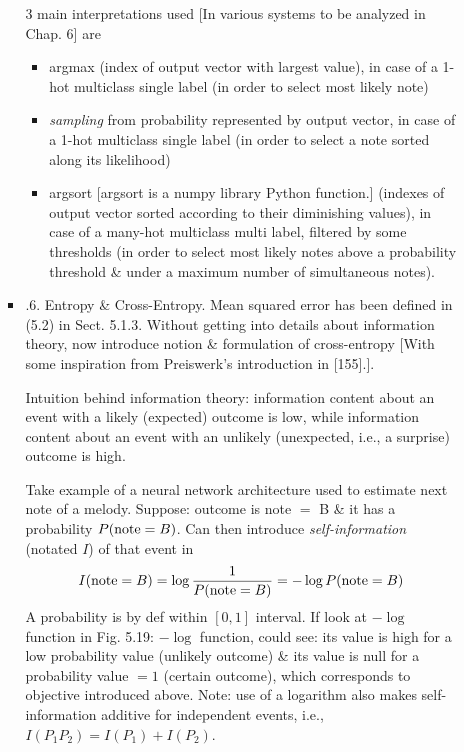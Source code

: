 \documentclass{article}
\begin{document}
\begin{itemize}
\begin{itemize}
\begin{itemize}
\begin{itemize}
			\end{itemize}
			3 main interpretations used [In various systems to be analyzed in Chap. 6] are
			\begin{itemize}
				\item argmax (index of output vector with largest value), in case of a 1-hot multiclass single label (in order to select most likely note)
				\item {\it sampling} from probability represented by output vector, in case of a 1-hot multiclass single label (in order to select a note sorted along its likelihood)
				\item argsort [argsort is a numpy library Python function.] (indexes of output vector sorted according to their diminishing values), in case of a many-hot multiclass multi label, filtered by some thresholds (in order to select most likely notes above a probability threshold \& under a maximum number of simultaneous notes).
			\end{itemize}
			\item {.6. Entropy \& Cross-Entropy.} Mean squared error has been defined in (5.2) in Sect. 5.1.3. Without getting into details about information theory, now introduce notion \& formulation of cross-entropy [With some inspiration from Preiswerk's introduction in [155].].

			Intuition behind information theory: information content about an event with a likely (expected) outcome is low, while information content about an event with an unlikely (unexpected, i.e., a surprise) outcome is high.

			Take example of a neural network architecture used to estimate next note of a melody. Suppose: outcome is note $=$ B \& it has a probability $P({\rm note} = B)$. Can then introduce {\it self-information} (notated $I$) of that event in
			\begin{equation*}
				I({\rm note} = B) = \log\frac{1}{P({\rm note} = B)} = -\log P({\rm note} = B)
			\end{equation*}
			A probability is by def within $[0,1]$ interval. If look at $-\log$ function in {\sf Fig. 5.19: $-\log$ function}, could see: its value is high for a low probability value (unlikely outcome) \& its value is null for a probability value $= 1$ (certain outcome), which corresponds to objective introduced above. Note: use of a logarithm also makes self-information additive for independent events, i.e., $I(P_1P_2) = I(P_1) + I(P_2)$.


\end{itemize}
\end{itemize}
\end{itemize}
\end{document}
